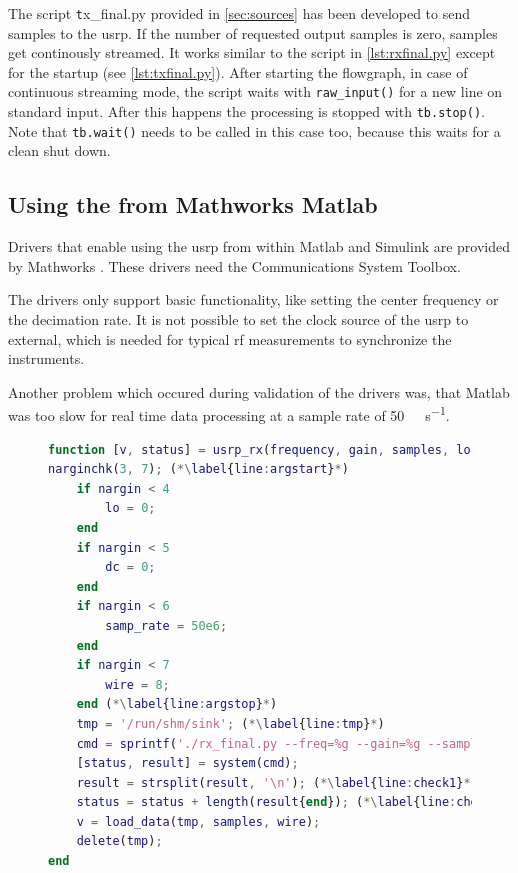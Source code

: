 \documentclass[12pt,a4paper,parskip=full,abstracton]{scrartcl}
\begin{document}
The script {\texttt tx\_final.py} provided in \cref{sec:sources} has been
developed to send samples to the \gls{usrp}. If the number of requested
output samples is zero, samples get continously streamed. It works similar
to the script in \cref{lst:rxfinal.py} except for the startup
(see \cref{lst:txfinal.py}). After starting the flowgraph, in case of continuous
streaming mode, the script waits with \lstinline{raw_input()}
for a new line on standard input. After this happens the processing is stopped
with \lstinline{tb.stop()}. Note that \lstinline{tb.wait()} needs to be called
in this case too, because this waits for a clean shut down.

\subsection{Using the  from Mathworks Matlab}

Drivers that enable using the \gls{usrp} from within Matlab and Simulink are
provided by Mathworks \cite{matlab_usrp}. These drivers need the Communications
System Toolbox.

The drivers only support basic functionality, like setting the center frequency
or the decimation rate. It is not possible to set the clock source of the
\gls{usrp} to external, which is needed for typical \gls{rf} measurements to
synchronize the instruments.

Another problem which occured during validation of the drivers was, that Matlab
was too slow for real time data processing at a sample rate of
\SI{50}{\mega\samples\per\second}.

\begin{figure}[htb]
    \centering
    \begin{lstlisting}[language=matlab,basicstyle=\tiny,caption={Matlab \gls{usrp} \gls{rx} function ({\ttfamily usrp\_rx.m)}},label=lst:usrprx.m]
function [v, status] = usrp_rx(frequency, gain, samples, lo, dc, samp_rate, wire)
narginchk(3, 7); (*\label{line:argstart}*)
    if nargin < 4
        lo = 0;
    end
    if nargin < 5
        dc = 0;
    end
    if nargin < 6
        samp_rate = 50e6;
    end
    if nargin < 7
        wire = 8;
    end (*\label{line:argstop}*)
    tmp = '/run/shm/sink'; (*\label{line:tmp}*)
    cmd = sprintf('./rx_final.py --freq=%g --gain=%g --samples=%d --filename=%s --lo-off=%g --dc=%d --samp-rate=%g --wire=%d', frequency, gain, samples, tmp, lo, dc, samp_rate, wire);
    [status, result] = system(cmd);
    result = strsplit(result, '\n'); (*\label{line:check1}*)
    status = status + length(result{end}); (*\label{line:check2}*)
    v = load_data(tmp, samples, wire);
    delete(tmp);
end
    \end{lstlisting}
\end{figure}
\end{document}
